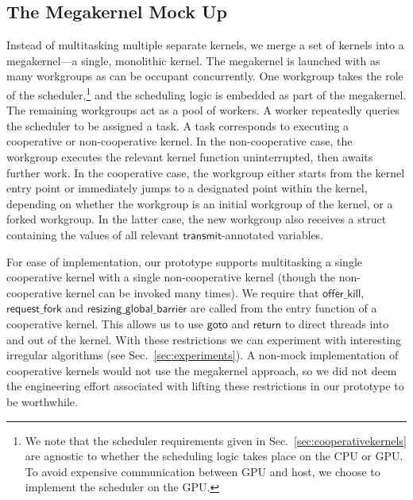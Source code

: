\documentclass[sigconf]{acmart}
\newcommand{\TSAdded}[1]{#1}
\newcommand{\mysec}{Sec.~}
\newcommand{\transmit}{\mathsf{transmit}}
\newcommand{\offerfork}{\mathsf{request\_fork}}
\newcommand{\offerkill}{\mathsf{offer\_kill}}
\newcommand{\resizingglobalbarrier}{\mathsf{resizing\_global\_barrier}}
\newcommand{\keyword}[1]{\mathsf{#1}}
\begin{document}
{\subsection{The Megakernel Mock Up}\label{sec:megakernel}

Instead of multitasking multiple separate kernels, we merge a set of
kernels into a megakernel---a single, monolithic kernel.  The
megakernel is launched with as many workgroups as can be occupant
concurrently.  One workgroup takes the role of the
scheduler,\footnote{\TSAdded{We note that the scheduler requirements
    given in \mysec{\ref{sec:cooperativekernels}} are agnostic to
    whether the scheduling logic takes place on the CPU or GPU. To
    avoid expensive communication between GPU and host, we choose to
    implement the scheduler on the GPU.}  } and the scheduling logic
is embedded as part of the megakernel.  The remaining workgroups act
as a pool of workers.  A worker repeatedly queries the scheduler to be
assigned a task.  A task corresponds to executing a cooperative or
non-cooperative kernel.  In the non-cooperative case, the workgroup
executes the relevant kernel function uninterrupted, then awaits
further work.  In the cooperative case, the workgroup either starts
from the kernel entry point or immediately jumps to a designated point
within the kernel, depending on whether the workgroup is an initial
workgroup of the kernel, or a forked workgroup.  In the latter case,
the new workgroup also receives a struct containing the values of all
relevant $\transmit$-annotated variables.

%
For ease of implementation, our prototype supports multitasking a
single cooperative kernel with a single non-cooperative kernel (though
the non-cooperative kernel can be invoked many times).
We require that $\offerkill$, $\offerfork$ and
$\resizingglobalbarrier$ are called from the entry function of a
cooperative kernel.  This allows us to use $\keyword{goto}$ and
$\keyword{return}$ to direct threads into and out of the kernel.  With
these restrictions we can experiment with interesting irregular
algorithms (see \mysec\ref{sec:experiments}).  A non-mock
implementation of cooperative kernels would not use the megakernel
approach, so we did not deem the engineering effort associated with
lifting these restrictions in our prototype to be worthwhile.

}
\end{document}
